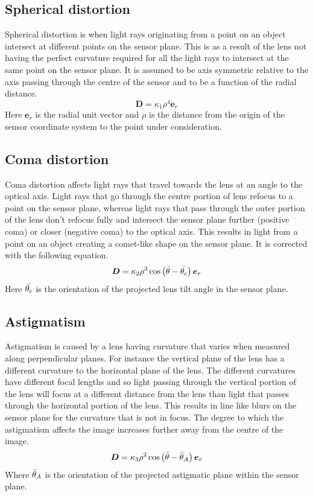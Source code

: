 \subsection{Spherical distortion}
Spherical distortion is when light rays originating from a point on an object intersect at different points on the sensor plane. This is as a result of the lens not having the perfect curvature required for all the light rays to intersect at the same point on the sensor plane. It is assumed to be axis symmetric relative to the axis passing through the centre of the sensor and to be a function of the radial distance.
\begin{equation}
	\bm{D} = \kappa_1 \rho ^4 \bm{e}_r
\end{equation}
Here $\bm{e}_r$ is the radial unit vector and $\rho$ is the distance from the origin of the sensor coordinate system to the point under consideration.

\subsection{Coma distortion}
Coma distortion affects light rays that travel towards the lens at an angle to the optical axis. Light rays that go through the centre portion of lens refocus to a point on the sensor plane, whereas light rays that pass through the outer portion of the lens don't refocus fully and intersect the sensor plane further (positive coma) or closer (negative coma) to the optical axis. This results in light from a point on an object creating a comet-like shape on the sensor plane. It is corrected with the following equation.
\begin{equation}
	\bm{D} = \kappa_2 \rho^3 \cos \left( \bar{\theta} - \bar{\theta_c} \right) \bm{e}_r
\end{equation}
Here $\bar{\theta_c}$ is the orientation of the projected lens tilt angle in the sensor plane.

\subsection{Astigmatism}
Astigmatism is caused by a lens having curvature that varies when measured along perpendicular planes. For instance the vertical plane of the lens has a different curvature to the horizontal plane of the lens. The different curvatures have different focal lengths and so light passing through the vertical portion of the lens will focus at a different distance from the lens than light that passes through the horizontal portion of the lens. This results in line like blurs on the sensor plane for the curvature that is not in focus. The degree to which the astigmatism affects the image increases further away from the centre of the image.
\begin{equation}
	\bm{D} = \kappa_3 \rho^2 \cos \left( \bar{\theta} - \bar{\theta}_A \right) \bm{e}_r
\end{equation}
Where $\bar{\theta}_A$ is the orientation of the projected astigmatic plane within the sensor plane.

